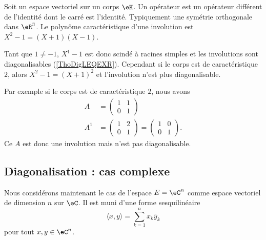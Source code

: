 \begin{example}     \label{ExewINgYo}
    Soit un espace vectoriel sur un corps \( \eK\). Un opérateur  est un opérateur différent de l'identité dont le carré est l'identité. Typiquement une symétrie orthogonale dans \( \eR^3\). Le polynôme caractéristique d'une involution est \( X^2-1=(X+1)(X-1)\).
    
    Tant que \( 1\neq -1\), \( X^1-1\) est donc scindé à racines simples et les involutions sont diagonalisables (\ref{ThoDigLEQEXR}). Cependant si le corps est de caractéristique \( 2\), alors \( X^2-1=(X+1)^2\) et l'involution n'est plus diagonalisable.

    Par exemple si le corps est de caractéristique \( 2\), nous avons
    \begin{subequations}
        \begin{align}
            A&=\begin{pmatrix}
                1    &   1    \\ 
                0    &   1    
            \end{pmatrix}\\
            A^1&=\begin{pmatrix}
                1    &   2    \\ 
                0    &   1    
            \end{pmatrix}=\begin{pmatrix}
                1    &   0    \\ 
                0    &   1    
            \end{pmatrix}.
        \end{align}
    \end{subequations}
    Ce \( A\) est donc une involution mais n'est pas diagonalisable.
\end{example}



\subsection{Diagonalisation : cas complexe}

Nous considérons maintenant le cas de l'espace \( E=\eC^n\) comme espace vectoriel de dimension \( n\) sur \( \eC\). Il est muni d'une forme sesquilinéaire
\begin{equation}    \label{EqFormSesqQrjyPH}
    \langle x, y\rangle =\sum_{k=1}^nx_k\bar y_k
\end{equation}
pour tout \( x,y\in\eC^n\).

